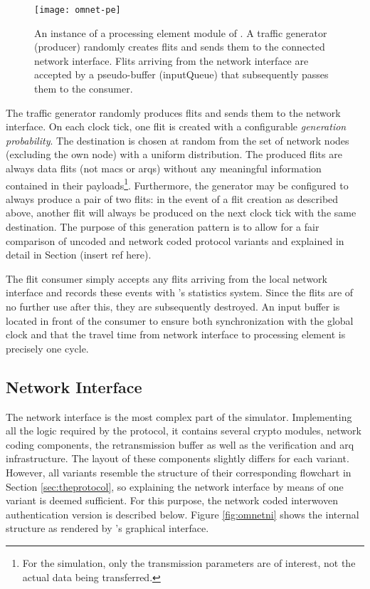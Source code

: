 \begin{figure}
    \centering
    \texttt{[image: omnet-pe]}
    \caption[Simulator view of the processing element]{An instance of a processing element module of \omnet{}. A traffic generator (producer) randomly
    creates flits and sends them to the connected network interface. Flits arriving from the network interface are accepted by a pseudo-buffer
    (inputQueue) that subsequently passes them to the consumer.}
    \label{fig:omnetpe}
\end{figure}

The traffic generator randomly produces flits and sends them to the network interface. On each clock tick, one flit is created with a configurable
\textit{generation probability}. The destination is chosen at random from the set of network nodes (excluding the own node) with a uniform
distribution. The produced flits are always data flits (not \glspl{mac} or \glspl{arq}) without any meaningful information contained in their
payloads\footnote{For the simulation, only the transmission parameters are of interest, not the actual data being transferred.}. Furthermore, the
generator may be configured to always produce a pair of two flits: in the event of a flit creation as described above, another flit will always be
produced on the next clock tick with the same destination. The purpose of this generation pattern is to allow for a fair comparison of uncoded and
network coded protocol variants and explained in detail in Section (insert ref here).

The flit consumer simply accepts any flits arriving from the local network interface and records these events with \omnet{}'s statistics system. Since
the flits are of no further use after this, they are subsequently destroyed. An input buffer is located in front of the consumer to ensure both
synchronization with the global clock and that the travel time from network interface to processing element is precisely one cycle.

\subsection{Network Interface}
The network interface is the most complex part of the simulator. Implementing all the logic required by the protocol, it contains several crypto
modules, network coding components, the retransmission buffer as well as the verification and \gls{arq} infrastructure. The layout of these components
slightly differs for each variant. However, all variants resemble the structure of their corresponding flowchart in Section \ref{sec:theprotocol}, so
explaining the network interface by means of one variant is deemed sufficient. For this purpose, the network coded interwoven authentication version
is described below. Figure \vref{fig:omnetni} shows the internal structure as rendered by \omnet{}'s graphical interface.

